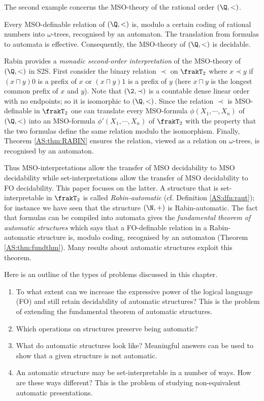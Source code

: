 The second example concerns the MSO-theory of the rational order $(\Q,<)$.

\begin{corollary} \label{AS:cor:rationals}
Every MSO-definable relation of $(\Q,<)$ is, modulo a certain coding of rational numbers into $\omega$-trees, recognised by an automaton. The translation from formulas to automata is effective. Consequently, the MSO-theory of $(\Q,<)$ is decidable.
\end{corollary}

Rabin \cite{Rabi69} provides a {\em monadic second-order interpretation} of the MSO-theory of $(\Q,<)$ in S2S.
First consider the binary relation 
 $\prec$ on $\frakT_2$ where $x \prec y$ if $(x \sqcap y)0$ is a prefix of $x$ or 
$(x \sqcap y)1$ is a prefix of $y$ (here $x \sqcap y$ is the longest common prefix of $x$ and $y$). %
Note that $(\2,\prec)$ is a countable dense linear order with no endpoints;  so it is isomorphic to $(\Q,<)$.
Since the relation $\prec$ is MSO-definable in $\frakT_2$ one can translate every MSO-formula $\phi(X_1,\cdots,X_n)$ of $(\Q,<)$ into an MSO-formula
$\phi'(X_1,\cdots,X_n)$ of $\frakT_2$  with the property that
the two formulas define the same relation modulo the isomorphism. Finally, Theorem \ref{AS:thm:RABIN}  ensures
the relation, viewed as a relation on $\omega$-trees, is recognised by an automaton.

Thus MSO-interpretations allow the transfer of MSO decidability to MSO decidability while set-interpretations
allow the transfer of MSO decidability to FO decidability. This paper focuses on the latter.
A structure that is set-interpretable in $\frakT_2$ is called {\em Rabin-automatic} (cf. Definition \ref{AS:dfn:raut}); for instance we have seen that
the structure $(\N,+)$ is Rabin-automatic.
The fact that formulas can be compiled into automata gives
the {\em fundamental theorem of automatic
structures} which says that a FO-definable relation in a Rabin-automatic structure
is, modulo coding, recognised by an automaton (Theorem  \ref{AS:thm:fundthm}). Many results about automatic structures exploit this theorem.  


Here is an outline of the types of problems discussed in this chapter.

\begin{enumerate}
\item To what extent can we increase the expressive power of the logical language (FO) and still retain decidability of automatic structures? 
This is the problem of extending the fundamental theorem of automatic structures.
\item Which operations on structures preserve being automatic?
\item What do automatic structures look like? Meaningful answers can be used to show that a given structure is not automatic.
\item An automatic structure may be set-interpretable in a number of ways. How are these ways different?
This is the problem of studying non-equivalent automatic presentations.
\end{enumerate}

